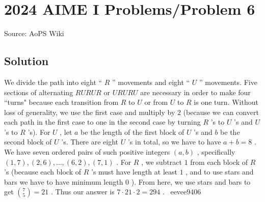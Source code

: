 \documentclass[12pt]{article}
\begin{document}
\section*{{2024 AIME I Problems/Problem 6}}
Source: AoPS Wiki

\subsection*{Solution}
We divide the path into eight “ $R$ ” movements and eight “ $U$ ” movements. Five sections of alternating $RURUR$ or $URURU$ are necessary in order to make four “turns" because each transition from $R$ to $U$ or from $U$ to $R$ is one turn. Without loss of generality, we use the first case and multiply by $2$ (because we can convert each path in the first case to one in the second case by turning $R$ 's to $U$ 's and $U$ 's to $R$ 's). For $U$ , let $a$ be the length of the first block of $U$ 's and $b$ be the second block of $U$ 's. There are eight $U$ 's in total, so we have to have $a+b=8$ . We have seven ordered pairs of such positive integers $(a,b)$ , specifically $(1,7),(2,6),\ldots,(6,2),(7,1)$ . For $R$ , we subtract $1$ from each block of $R$ 's (because each block of $R$ 's must have length at least $1$ , and to use stars and bars we have to have minimum length $0$ ). From here, we use stars and bars to get ${7 \choose 5}=21$ . Thus our answer is $7\cdot21\cdot2=\boxed{294}$ . ~eevee9406
\end{document}
